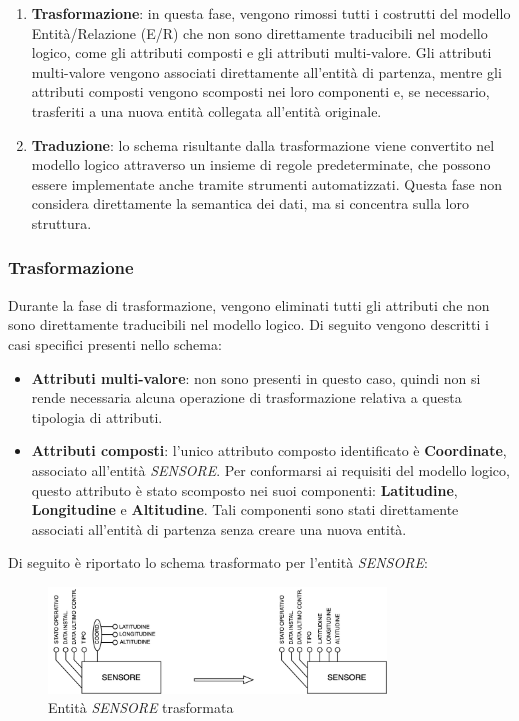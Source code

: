 \begin{enumerate}
    \item \textbf{Trasformazione}: in questa fase, vengono rimossi tutti i costrutti del modello Entità/Relazione (E/R) che non sono direttamente traducibili nel modello logico, come gli attributi composti e gli attributi multi-valore. Gli attributi multi-valore vengono associati direttamente all’entità di partenza, mentre gli attributi composti vengono scomposti nei loro componenti e, se necessario, trasferiti a una nuova entità collegata all’entità originale.
    \item \textbf{Traduzione}: lo schema risultante dalla trasformazione viene convertito nel modello logico attraverso un insieme di regole predeterminate, che possono essere implementate anche tramite strumenti automatizzati. Questa fase non considera direttamente la semantica dei dati, ma si concentra sulla loro struttura.
\end{enumerate}

\subsubsection{Trasformazione}

Durante la fase di trasformazione, vengono eliminati tutti gli attributi che non sono direttamente traducibili nel modello logico. Di seguito vengono descritti i casi specifici presenti nello schema:

\begin{itemize}
    \item \textbf{Attributi multi-valore}: non sono presenti in questo caso, quindi non si rende necessaria alcuna operazione di trasformazione relativa a questa tipologia di attributi.
    \item \textbf{Attributi composti}: l'unico attributo composto identificato è \textbf{Coordinate}, associato all'entità \textit{SENSORE}. Per conformarsi ai requisiti del modello logico, questo attributo è stato scomposto nei suoi componenti: \textbf{Latitudine}, \textbf{Longitudine} e \textbf{Altitudine}. Tali componenti sono stati direttamente associati all’entità di partenza senza creare una nuova entità.
\end{itemize}

Di seguito è riportato lo schema trasformato per l'entità \textit{SENSORE}:\\

\begin{figure}[h!]
    \centering
    \includegraphics[width=0.8\textwidth]{Media/Trasformazione_Sensore.png}
    \caption{Entità \textit{SENSORE} trasformata}
    \label{fig:schema_portante}
\end{figure}

